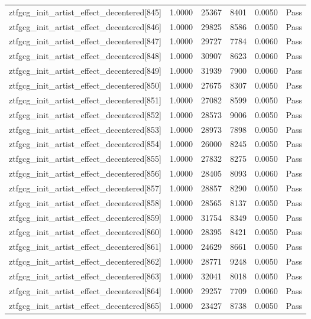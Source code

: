 \begin{table}[htbp]
\begin{tabular}{llrrll}
ztfgcg\_init\_artist\_effect\_decentered[845] & 1.0000 & 25367 & 8401 & 0.0050 & Pass \\
ztfgcg\_init\_artist\_effect\_decentered[846] & 1.0000 & 29825 & 8586 & 0.0050 & Pass \\
ztfgcg\_init\_artist\_effect\_decentered[847] & 1.0000 & 29727 & 7784 & 0.0060 & Pass \\
ztfgcg\_init\_artist\_effect\_decentered[848] & 1.0000 & 30907 & 8623 & 0.0060 & Pass \\
ztfgcg\_init\_artist\_effect\_decentered[849] & 1.0000 & 31939 & 7900 & 0.0060 & Pass \\
ztfgcg\_init\_artist\_effect\_decentered[850] & 1.0000 & 27675 & 8307 & 0.0050 & Pass \\
ztfgcg\_init\_artist\_effect\_decentered[851] & 1.0000 & 27082 & 8599 & 0.0050 & Pass \\
ztfgcg\_init\_artist\_effect\_decentered[852] & 1.0000 & 28573 & 9006 & 0.0050 & Pass \\
ztfgcg\_init\_artist\_effect\_decentered[853] & 1.0000 & 28973 & 7898 & 0.0050 & Pass \\
ztfgcg\_init\_artist\_effect\_decentered[854] & 1.0000 & 26000 & 8245 & 0.0050 & Pass \\
ztfgcg\_init\_artist\_effect\_decentered[855] & 1.0000 & 27832 & 8275 & 0.0050 & Pass \\
ztfgcg\_init\_artist\_effect\_decentered[856] & 1.0000 & 28405 & 8093 & 0.0060 & Pass \\
ztfgcg\_init\_artist\_effect\_decentered[857] & 1.0000 & 28857 & 8290 & 0.0050 & Pass \\
ztfgcg\_init\_artist\_effect\_decentered[858] & 1.0000 & 28565 & 8137 & 0.0050 & Pass \\
ztfgcg\_init\_artist\_effect\_decentered[859] & 1.0000 & 31754 & 8349 & 0.0050 & Pass \\
ztfgcg\_init\_artist\_effect\_decentered[860] & 1.0000 & 28395 & 8421 & 0.0050 & Pass \\
ztfgcg\_init\_artist\_effect\_decentered[861] & 1.0000 & 24629 & 8661 & 0.0050 & Pass \\
ztfgcg\_init\_artist\_effect\_decentered[862] & 1.0000 & 28771 & 9248 & 0.0050 & Pass \\
ztfgcg\_init\_artist\_effect\_decentered[863] & 1.0000 & 32041 & 8018 & 0.0050 & Pass \\
ztfgcg\_init\_artist\_effect\_decentered[864] & 1.0000 & 29257 & 7709 & 0.0060 & Pass \\
ztfgcg\_init\_artist\_effect\_decentered[865] & 1.0000 & 23427 & 8738 & 0.0050 & Pass \\

\end{tabular}
\end{table}
